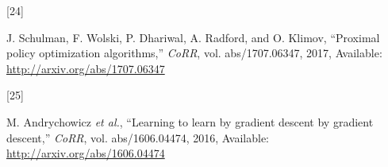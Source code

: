 \documentclass[
  letterpaper,
]{report}
\newlength{\cslhangindent}
\newlength{\csllabelwidth}
\newlength{\cslentryspacingunit} %
\newenvironment{CSLReferences}[2] %
 {%
  \setlength{\parindent}{0pt}
  \ifodd #1
  \let\oldpar\par
  \def\par{\hangindent=\cslhangindent\oldpar}
  \fi
  \setlength{\parskip}{#2\cslentryspacingunit}
 }%
 {}
\newcommand{\CSLLeftMargin}[1]{\parbox[t]{\csllabelwidth}{#1}}
\newcommand{\CSLRightInline}[1]{\parbox[t]{\linewidth - \csllabelwidth}{#1}\break}
\theoremstyle{plain}
\theoremstyle{definition}
\theoremstyle{definition}
\theoremstyle{remark}
\begin{document}
\begin{CSLReferences}{0}{0}
\leavevmode{}%
\CSLLeftMargin{{[}24{]} }%
\CSLRightInline{J. Schulman, F. Wolski, P. Dhariwal, A. Radford, and O.
Klimov, {``Proximal policy optimization algorithms,''} \emph{CoRR}, vol.
abs/1707.06347, 2017, Available: \url{http://arxiv.org/abs/1707.06347}}

\leavevmode{}%
\CSLLeftMargin{{[}25{]} }%
\CSLRightInline{M. Andrychowicz \emph{et al.}, {``Learning to learn by
gradient descent by gradient descent,''} \emph{CoRR}, vol.
abs/1606.04474, 2016, Available: \url{http://arxiv.org/abs/1606.04474}}

\end{CSLReferences}
\end{document}
